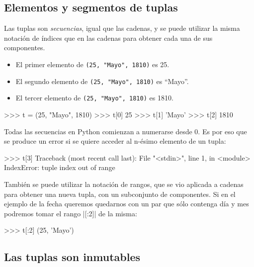 \subsection{Elementos y segmentos de tuplas}

Las tuplas son {\it secuencias}, igual que las cadenas, y se puede utilizar la
misma notación de índices que en las cadenas para obtener cada una de sus
componentes.

\begin{itemize}
\item El primer elemento de \lstinline!(25, "Mayo", 1810)! es 25.
\item El segundo elemento de \lstinline!(25, "Mayo", 1810)! es ``Mayo''.
\item El tercer elemento de \lstinline!(25, "Mayo", 1810)! es 1810.
\end{itemize}

\begin{codigo-python-sn}
>>> t = (25, "Mayo", 1810)
>>> t[0]
25
>>> t[1]
'Mayo'
>>> t[2]
1810
\end{codigo-python-sn}

\begin{atencion}
Todas las secuencias en Python comienzan a numerarse desde 0.  Es por eso
que se produce un error si se quiere acceder al n-ésimo elemento de un
tupla:

\begin{codigo-python-sn}
>>> t[3]
Traceback (most recent call last):
  File "<stdin>", line 1, in <module>
IndexError: tuple index out of range
\end{codigo-python-sn}
\end{atencion}

También se puede utilizar la notación de rangos, que se vio aplicada a
cadenas para obtener una nueva tupla, con un subconjunto de componentes. Si
en el ejemplo de la fecha queremos quedarnos con un par que sólo contenga
día y mes podremos tomar el rango |[:2]| de la misma:

\begin{codigo-python-sn}
>>> t[:2]
(25, 'Mayo')
\end{codigo-python-sn}


\subsection{Las tuplas son inmutables}

